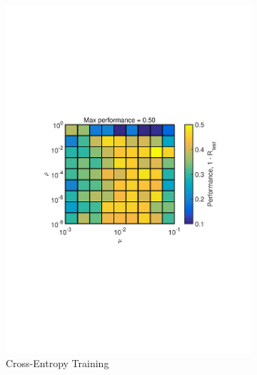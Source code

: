 \documentclass[journal,a4paper,onecolumn,11pt]{IEEEtran}
\begin{document}
\begin{figure}[!h]
\begin{subfigure}{.5\textwidth}
		\includegraphics[width=\textwidth]{para_opt_digit_ce.pdf}
		\caption{Cross-Entropy Training}
		\label{fig:para_opt_digit_ce}
	\end{subfigure}
	\begin{subfigure}{.5\textwidth}
		\centering

\end{subfigure}
\end{figure}
\end{document}
